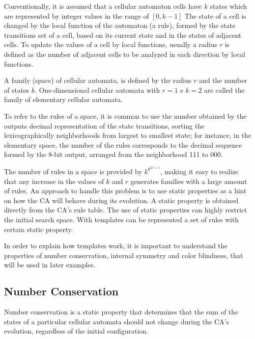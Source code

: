 \documentclass{llncs}
\begin{document}
Conventionally, it is assumed that a cellular automaton cells have $k$ states which are represented by integer values in the range of $[0, k-1]$ The state of a cell is changed by the local function of the automaton (a rule), formed by the state transitions set of a cell, based on its current state and in the states of adjacent cells. To update the values of a cell by local functions, usually a radius $r$ is defined as the number of adjacent cells to be analyzed in each direction by local functions.

A family (space) of cellular automata, is defined by the radius $r$ and the number of states $k$. One-dimensional cellular automata with $r=1$ e $k=2$ are called the family of elementary cellular automata.

To refer to the rules of a space, it is common to use the number obtained by the outputs decimal representation  of the state transitions, sorting the lexicographically neighborhoods from largest to smallest state; for instance, in the elementary space, the number of the rules corresponds to the decimal sequence formed by the 8-bit output, arranged from the neighborhood 111 to 000.

The number of rules in a space is provided by $k^{k^{2r+1}}$, making it easy to realize that any increase in the values of $k$ and $r$ generates families with a large amount of rules. An approach to handle this problem is to use static properties as a hint on how the CA will behave during its evolution. A static property is obtained directly from the CA's rule table. The use of static properties can highly restrict the initial search space. With templates can be represented a set of rules with certain static property.

In order to explain how templates work, it is important to understand the properties of number conservation, internal symmetry and color blindness, that will be used in later examples.

\subsection{Number Conservation}
Number conservation is a static property that determines that the sum of the states of a particular cellular automata should not change during the CA's evolution, regardless of the initial configuration.
\end{document}
